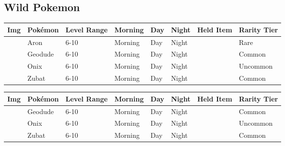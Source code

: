 \subsection{Wild Pokemon}%
\label{subsec:WildPokemon}%
\begin{longtable}{||l l l l l l l l||}%
\hline%
Img&Pokémon&Level Range&Morning&Day&Night&Held Item&Rarity Tier\\%
\hline%
\endhead%
\hline%
&Aron&6{-}10&Morning&Day&Night&&Rare\\%
\hline%
&Geodude&6{-}10&Morning&Day&Night&&Common\\%
\hline%
&Onix&6{-}10&Morning&Day&Night&&Uncommon\\%
\hline%
&Zubat&6{-}10&Morning&Day&Night&&Common\\%
\hline%
\end{longtable}%
\begin{longtable}{||l l l l l l l l||}%
\hline%
Img&Pokémon&Level Range&Morning&Day&Night&Held Item&Rarity Tier\\%
\hline%
\endhead%
\hline%
&Geodude&6{-}10&Morning&Day&Night&&Common\\%
\hline%
&Onix&6{-}10&Morning&Day&Night&&Uncommon\\%
\hline%
&Zubat&6{-}10&Morning&Day&Night&&Common\\%
\hline%
\end{longtable}